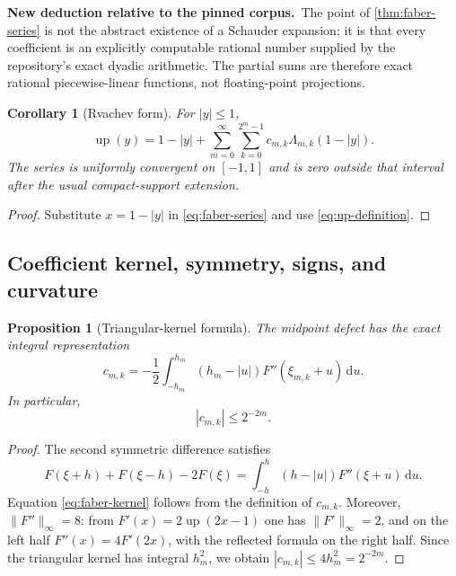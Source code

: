 \documentclass[11pt,oneside]{article}
\newtheorem{proposition}[theorem]{Proposition}
\newtheorem{corollary}[theorem]{Corollary}
\theoremstyle{definition}
\theoremstyle{remark}
\newcommand{\Up}{\operatorname{up}}
\newcommand{\dd}{\,\mathrm d}
\newcommand{\1}{\mathbf 1}
\newcommand{\newresult}{\textcolor{newgreen}{\textbf{New deduction relative to the pinned corpus.}}\ }
\begin{document}
\newresult The point of \cref{thm:faber-series} is not the abstract existence
of a Schauder expansion; it is that every coefficient is an explicitly
computable rational number supplied by the repository's exact dyadic
arithmetic.  The partial sums are therefore exact rational piecewise-linear
functions, not floating-point projections.

\begin{corollary}[Rvachev form]
\label{cor:up-faber}
For $|y|\le1$,
\begin{equation}
 \boxed{\displaystyle
 \Up(y)=1-|y|+
 \sum_{m=0}^\infty\sum_{k=0}^{2^m-1}
 c_{m,k}\Lambda_{m,k}(1-|y|).}                           \label{eq:up-faber}
\end{equation}
The series is uniformly convergent on $[-1,1]$ and is zero outside that
interval after the usual compact-support extension.
\end{corollary}

\begin{proof}
Substitute $x=1-|y|$ in \eqref{eq:faber-series} and use
\eqref{eq:up-definition}.
\end{proof}

\subsection{Coefficient kernel, symmetry, signs, and curvature}

\begin{proposition}[Triangular-kernel formula]
\label{prop:faber-kernel}
The midpoint defect has the exact integral representation
\begin{equation}
 \boxed{\displaystyle
 c_{m,k}=-\frac12\int_{-h_m}^{h_m}
 (h_m-|u|)F''(\xi_{m,k}+u)\dd u.}                        \label{eq:faber-kernel}
\end{equation}
In particular,
\begin{equation}
 |c_{m,k}|\le2^{-2m}.                                    \label{eq:faber-bound}
\end{equation}
\end{proposition}

\begin{proof}
The second symmetric difference satisfies
\[
 F(\xi+h)+F(\xi-h)-2F(\xi)
 =\int_{-h}^{h}(h-|u|)F''(\xi+u)\dd u.
\]
Equation \eqref{eq:faber-kernel} follows from the definition of $c_{m,k}$.
Moreover, $\|F''\|_\infty=8$: from
$F'(x)=2\Up(2x-1)$ one has $\|F'\|_\infty=2$, and on the
left half $F''(x)=4F'(2x)$, with the reflected formula on the right half.
Since the triangular kernel has integral $h_m^2$, we obtain
$|c_{m,k}|\le4h_m^2=2^{-2m}$.
\end{proof}
\end{document}
